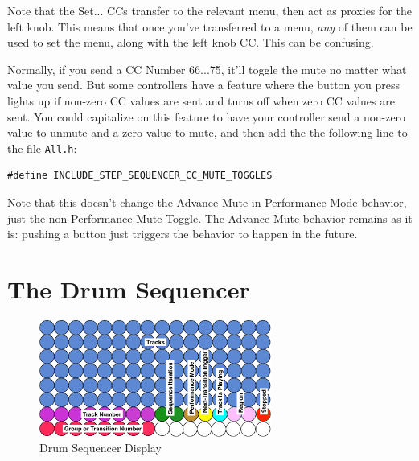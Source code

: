 \documentclass{article}
\begin{document}
\vspace{1em}
\noindent Note that the Set... CCs transfer to the relevant menu, then act as proxies for the left knob.  This means that once you've transferred to a menu, {\it any} of them can be used to set the menu, along with the left knob CC.  This can be confusing.

Normally, if you send a CC Number 66...75, it'll toggle the mute no matter what value you send.  But some controllers have a feature where the button you press lights up if non-zero CC values are sent and turns off when zero CC values are sent.  You could capitalize on this feature to have your controller send a non-zero value to unmute and a zero value to mute, and then add the the following line to the file {\tt All.h}:

\begin{verbatim}
#define INCLUDE_STEP_SEQUENCER_CC_MUTE_TOGGLES
\end{verbatim}

Note that this doesn't change the Advance Mute in Performance Mode behavior, just the non-Performance Mute Toggle.  The Advance Mute behavior remains as it is: pushing a button just triggers the behavior to happen in the future.

\clearpage



\section {The Drum Sequencer}
\label{drumsequencersec}

\vspace{1em}

\begin{figure}
\vspace{-5.5em}\includegraphics[width=3in]{drumsequencer}
\vspace{-1em}\caption{\small Drum Sequencer Display}\vspace{-2em}
\label{drumsequencer}
\end{figure}
\end{document}
